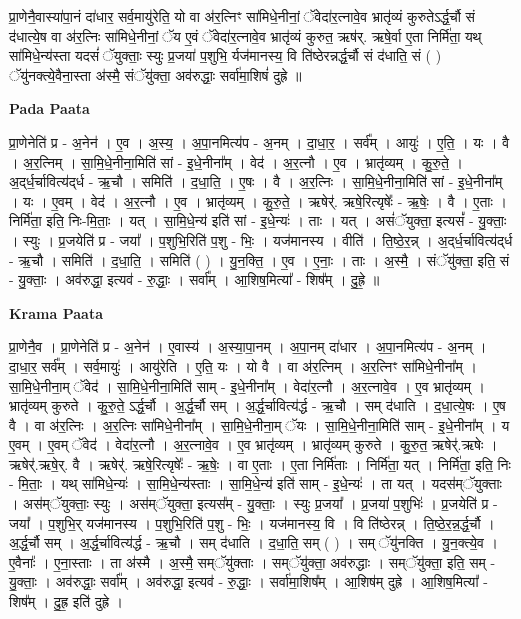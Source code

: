 \documentclass[17pt]{extarticle}
\begin{document}
प्रा॒णेनै॒वास्या॑पा॒नं दा॑धार॒ सर्व॒मायु॑रेति॒ यो वा अ॑र॒त्निꣳ सा॑मिधे॒नीनां॒ ॅवेदा॑र॒त्नावे॒व भ्रातृ॑व्यं कुरुतेऽर्द्ध॒र्चौ सं द॑धात्ये॒ष वा अ॑र॒त्निः सा॑मिधे॒नीनां॒ ॅय ए॒वं ॅवेदा॑र॒त्नावे॒व भ्रातृ॑व्यं कुरुत॒ ऋष॑र्. ऋषे॒र्वा ए॒ता निर्मि॑ता॒ यथ् सा॑मिधे॒न्य॑स्ता यदसं॑ ॅयुक्ताः॒ स्युः प्र॒जया॑ प॒शुभि॒ र्यज॑मानस्य॒ वि ति॑ष्ठेरन्नर्द्ध॒र्चौ सं द॑धाति॒ सं ( ) ॅयु॑नक्त्ये॒वैना॒स्ता अ॑स्मै॒ संॅयु॑क्ता॒ अव॑रुद्धाः॒ सर्वा॑मा॒शिषं॑ दुह्रे ॥ \newline

\textbf{Pada Paata} \newline

प्रा॒णेनेति॑ प्र - अ॒नेन॑ । ए॒व । अ॒स्य॒ । अ॒पा॒नमित्य॑प - अ॒नम् । दा॒धा॒र॒ । सर्व᳚म् । आयुः॑ । ए॒ति॒ । यः । वै । अ॒र॒त्निम् । सा॒मि॒धे॒नीना॒मिति॑ सां - इ॒धे॒नीना᳚म् । वेद॑ । अ॒र॒त्नौ । ए॒व । भ्रातृ॑व्यम् । कु॒रु॒ते॒ । अ॒द्‌र्ध॒र्चावित्य॑द्‌र्ध - ऋ॒चौ । समिति॑ । द॒धा॒ति॒ । ए॒षः । वै । अ॒र॒त्निः । सा॒मि॒धे॒नीना॒मिति॑ सां - इ॒धे॒नीना᳚म् । यः । ए॒वम् । वेद॑ । अ॒र॒त्नौ । ए॒व । भ्रातृ॑व्यम् । कु॒रु॒ते॒ । ऋषेर्॑. ऋषे॒रित्यृषेः᳚ - ऋ॒षेः॒ । वै । ए॒ताः । निर्मि॑ता॒ इति॒ निः-मि॒ताः॒ । यत् । सा॒मि॒धे॒न्य॑ इति॑ सां - इ॒धे॒न्यः॑ । ताः । यत् । असं॑ॅयुक्ता॒ इत्यसं᳚ - यु॒क्ताः॒ । स्युः । प्र॒जयेति॑ प्र - जया᳚ । प॒शुभि॒रिति॑ प॒शु - भिः॒ । यज॑मानस्य । वीति॑ । ति॒ष्ठे॒र॒न्न् । अ॒द्‌र्ध॒र्चावित्य॑द्‌र्ध - ऋ॒चौ । समिति॑ । द॒धा॒ति॒ । समिति॑ ( ) । यु॒न॒क्ति॒ । ए॒व । ए॒नाः॒ । ताः । अ॒स्मै॒ । संॅयु॑क्ता॒ इति॒ सं - यु॒क्ताः॒ । अव॑रुद्धा॒ इत्यव॑ - रु॒द्धाः॒ । सर्वा᳚म् । आ॒शिष॒मित्या᳚ - शिष᳚म् । दु॒ह्रे॒ ॥  \newline


\textbf{Krama Paata} \newline

प्रा॒णेनै॒व । प्रा॒णेनेति॑ प्र - अ॒नेन॑ । ए॒वास्य॑ । अ॒स्या॒पा॒नम् । अ॒पा॒नम् दा॑धार । अ॒पा॒नमित्य॑प - अ॒नम् । दा॒धा॒र॒ सर्व᳚म् । सर्व॒मायुः॑ । आयु॑रेति । ए॒ति॒ यः । यो वै । वा अ॑र॒त्निम् । अ॒र॒त्निꣳ सा॑मिधे॒नीना᳚म् । सा॒मि॒धे॒नीना॒म् ॅवेद॑ । सा॒मि॒धे॒नीना॒मिति॑ साम् - इ॒धे॒नीना᳚म् । वेदा॑र॒त्नौ । अ॒र॒त्नावे॒व । ए॒व भ्रातृ॑व्यम् । भ्रातृ॑व्यम् कुरुते । कु॒रु॒ते॒ ऽर्द्ध॒र्चौ । अ॒र्द्ध॒र्चौ सम् । अ॒र्द्ध॒र्चावित्य॑र्द्ध - ऋ॒चौ । सम् द॑धाति । द॒धा॒त्ये॒षः । ए॒ष वै । वा अ॑र॒त्निः । अ॒र॒त्निः सा॑मिधे॒नीना᳚म् । सा॒मि॒धे॒नीना॒म् ॅयः । सा॒मि॒धे॒नीना॒मिति॑ साम् - इ॒धे॒नीना᳚म् । य ए॒वम् । ए॒वम् ॅवेद॑ । वेदा॑र॒त्नौ । अ॒र॒त्नावे॒व । ए॒व भ्रातृ॑व्यम् । भ्रातृ॑व्यम् कुरुते । कु॒रु॒त॒ ऋषेर्॑.ऋषेः । ऋषेर्॑.ऋषे॒र्. वै । ऋषेर्॑. ऋषे॒रित्यृषेः᳚ - ऋ॒षेः॒ । वा ए॒ताः । ए॒ता निर्मि॑ताः । निर्मि॑ता॒ यत् । निर्मि॑ता॒ इति॒ निः - मि॒ताः॒ । यथ् सा॑मिधे॒न्यः॑ । सा॒मि॒धे॒न्य॑स्ताः । सा॒मि॒धे॒न्य॑ इति॑ साम् - इ॒धे॒न्यः॑ । ता यत् । यदस॑म्ॅयुक्ताः । अस॑म्ॅयुक्ताः॒ स्युः । अस॑म्ॅयुक्ता॒ इत्यस᳚म् - यु॒क्ताः॒ । स्युः प्र॒जया᳚ । प्र॒जया॑ प॒शुभिः॑ । प्र॒जयेति॑ प्र - जया᳚ । प॒शुभि॒र् यज॑मानस्य । प॒शुभि॒रिति॑ प॒शु - भिः॒ । यज॑मानस्य॒ वि । वि ति॑ष्ठेरन्न् । ति॒ष्ठे॒र॒न्न॒र्द्ध॒र्चौ । अ॒र्द्ध॒र्चौ सम् । अ॒र्द्ध॒र्चावित्य॑र्द्ध - ऋ॒चौ । सम् द॑धाति । द॒धा॒ति॒ सम् ( ) । सम् ॅयु॑नक्ति । यु॒न॒क्त्ये॒व । ए॒वैनाः᳚ । ए॒ना॒स्ताः । ता अ॑स्मै । अ॒स्मै॒ सम्ॅयु॑क्ताः । सम्ॅयु॑क्ता॒ अव॑रुद्धाः । सम्ॅयु॑क्ता॒ इति॒ सम् - यु॒क्ताः॒ । अव॑रुद्धाः॒ सर्वा᳚म् । अव॑रुद्धा॒ इत्यव॑ - रु॒द्धाः॒ । सर्वा॑मा॒शिष᳚म् । आ॒शिष॑म् दुह्रे । आ॒शिष॒मित्या᳚ - शिष᳚म् । दु॒ह्र॒ इति॑ दुह्रे । \newline
\end{document}
